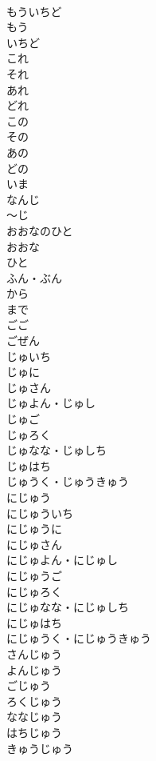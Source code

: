 \documentclass[8pt]{extreport}
\begin{document}
\begin{CJK}{UTF8}{min}
\\	もういちど		
\\	もう		
\\	いちど		
\\	これ		
\\	それ		
\\	あれ		
\\	どれ		
\\	この		
\\	その		
\\	あの		
\\	どの		
\\	いま		
\\	なんじ		
\\	〜じ		
\\	おおなのひと		
\\	おおな		
\\	ひと		
\\	ふん・ぶん		
\\	から		
\\	まで		
\\	ごご		
\\	ごぜん		
\\	じゅいち		
\\	じゅに		
\\	じゅさん		
\\	じゅよん・じゅし		
\\	じゅご		
\\	じゅろく		
\\	じゅなな・じゅしち		
\\	じゅはち		
\\	じゅうく・じゅうきゅう		
\\	にじゅう		
\\	にじゅういち		
\\	にじゅうに		
\\	にじゅさん		
\\	にじゅよん・にじゅし		
\\	にじゅうご		
\\	にじゅろく		
\\	にじゅなな・にじゅしち		
\\	にじゅはち		
\\	にじゅうく・にじゅうきゅう		
\\	さんじゅう		
\\	よんじゅう		
\\	ごじゅう		
\\	ろくじゅう		
\\	ななじゅう		
\\	はちじゅう		
\\	きゅうじゅう		

\end{CJK}
\end{document}
